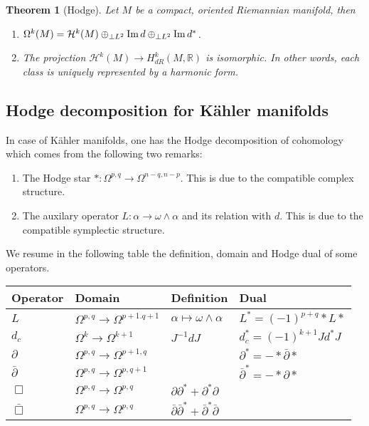 \documentclass[11pt]{article}
\newtheorem{theorem}{Theorem}
\newcommand{\im}{\mathop{\rm Im}\nolimits}
\begin{document}
\begin{theorem}[Hodge]
\label{thm:hodge-riemann}
Let \(M\) be a compact, oriented Riemannian manifold, then
\begin{enumerate}
\item \(\Omega^k(M) = \mathcal{H}^k(M) \oplus_{\perp L^2} \im d \oplus_{\perp L^2} \im d^*\).
\item The projection \(\mathcal{H}^k(M) \longrightarrow H^k_{dR}(M, \mathbb{R})\) is
isomorphic. In other words, each class is uniquely represented by a harmonic form.
\end{enumerate}
\end{theorem}

\subsection{Hodge decomposition for Kähler manifolds}
\label{sec:orgbe02f20}
In case of Kähler manifolds, one has the Hodge decomposition of cohomology which comes
from the following two remarks:
\begin{enumerate}
\item The Hodge star \(*: \Omega^{p,q} \longrightarrow \Omega^{n-q, n-p}\). This is due to
the compatible complex structure.
\item The auxilary operator \(L: \alpha \longrightarrow \omega\wedge \alpha\) and its
relation with \(d\). This is due to the compatible symplectic structure.
\end{enumerate}

We resume in the following table the definition, domain and Hodge dual of some operators.


\begin{center}
\begin{tabular}{llll}
Operator & Domain & Definition & Dual\\
\hline
\(L\) & \(\Omega^{p,q} \longrightarrow \Omega^{p+1.q+1}\) & \(\alpha \mapsto \omega\wedge \alpha\) & \(L^* = (-1)^{p+q}*L*\)\\
\(d_c\) & \(\Omega^k \longrightarrow \Omega^{k+1}\) & \(J^{-1} d J\) & \(d_c^* = (-1)^{k+1}Jd^* J\)\\
\(\partial\) & \(\Omega^{p,q} \longrightarrow \Omega^{p+1, q}\) &  & \(\partial^* = -*\bar \partial*\)\\
\(\bar \partial\) & \(\Omega^{p,q} \longrightarrow \Omega^{p,q+1}\) &  & \(\bar \partial^* = -* \partial *\)\\
\(\Box\) & \(\Omega^{p,q} \longrightarrow \Omega^{p,q}\) & \(\partial \partial^* + \partial^* \partial\) & \\
\(\bar \Box\) & \(\Omega^{p,q} \longrightarrow \Omega^{p,q}\) & \(\bar\partial \bar\partial^* + \bar\partial^* \bar\partial\) & \\
\hline
\end{tabular}
\end{center}
\end{document}
